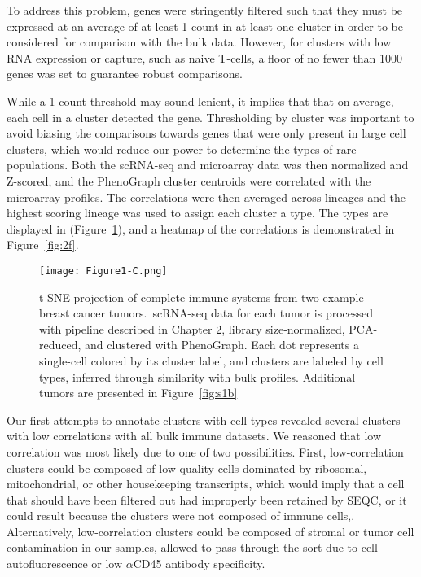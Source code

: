 To address this problem, genes were stringently filtered such that they must be expressed at an average of at least 1 count in at least one cluster in order to be considered for comparison with the bulk data. %
However, for clusters with low RNA expression or capture, such as naive T-cells, a floor of no fewer than 1000 genes was set to guarantee robust comparisons. 

While a 1-count threshold may sound lenient, it implies that that on average, each cell in a cluster detected the gene. 
Thresholding by cluster was important to avoid biasing the comparisons towards genes that were only present in large cell clusters, which would reduce our power to determine the types of rare populations. 
Both the scRNA-seq and microarray data was then normalized and Z-scored, and the PhenoGraph cluster centroids were correlated with the microarray profiles. 
The correlations were then averaged across lineages and the highest scoring lineage was used to assign each cluster a type. The types are displayed in (Figure~\ref{fig:1c}), and a heatmap of the correlations is demonstrated in Figure~\ref{fig:2f}.

\begin{figure}
\centering
\texttt{[image: Figure1-C.png]}
  \caption{t-SNE projection of complete immune systems from two example breast cancer tumors.\ scRNA-seq data for each tumor is processed with pipeline described in Chapter 2, library size-normalized, PCA-reduced, and clustered with PhenoGraph. Each dot represents a single-cell colored by its cluster label, and clusters are labeled by cell types, inferred through similarity with bulk profiles. Additional tumors are presented in Figure~\ref{fig:s1b}} 
\label{fig:1c}
\end{figure} 

Our first attempts to annotate clusters with cell types revealed several clusters with low correlations with all bulk immune datasets. 
We reasoned that low correlation was most likely due to one of two possibilities. 
First, low-correlation clusters could be composed of low-quality cells dominated by ribosomal, mitochondrial, or other housekeeping transcripts, which would imply that a cell that should have been filtered out had improperly been retained by SEQC, or it could result because the clusters were not composed of immune cells,.
Alternatively, low-correlation clusters could be composed of stromal or tumor cell contamination in our samples, allowed to pass through the sort due to cell autofluorescence or low $\alpha$CD45 antibody specificity. 


